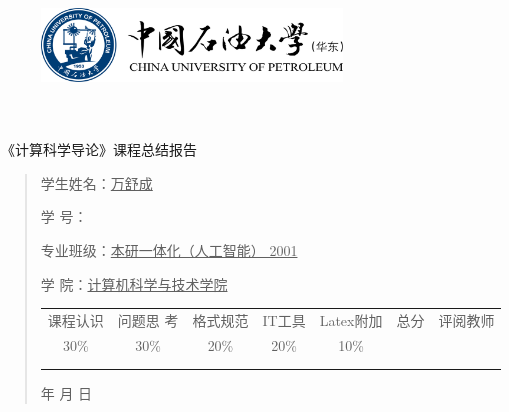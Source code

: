 \documentclass{article}
\renewcommand{\today}{\number\year 年 \number\month 月 \number\day 日}
\begin{document}
\begin{figure}
    \centering
    \includegraphics[width=8cm]{upc.png}

    \label{figupc}
\end{figure}

	\begin{center}
		\quad \\
		\quad \\
		\heiti \fontsize{45}{17} \quad \quad \quad 
		\vskip 1.5cm
		\heiti {} 《计算科学导论》课程总结报告
	\end{center}
	\vskip 2.0cm
		
	\begin{quotation}
		\doublespacing
		
        \par\setlength\parindent{7em}
		\quad 

		学生姓名：\underline{\qquad  万舒成 \qquad \qquad}

		学\hspace{0.61cm} 号：\underline{\qquad}
		
		专业班级：\underline{\qquad 本研一体化（人工智能） 2001\qquad  }
		
        学\hspace{0.61cm} 院：\underline{计算机科学与技术学院}
		\vskip 2cm
		\centering
		\begin{table}[h]
            \centering 
            \begin{tabular}{|c|c|c|c|c|c|c|}
                \hline
                课程认识 & 问题思 考 & 格式规范  & IT工具  & Latex附加  & 总分 & 评阅教师 \\
                30\% & 30\% & 20\% & 20\% & 10\% &  &  \\
                \hline
                 & & & & & &\\
                & & & & & &\\
                \hline
            \end{tabular}
        \end{table}
		\vskip 2cm
		\today
	\end{quotation}
\end{document}
